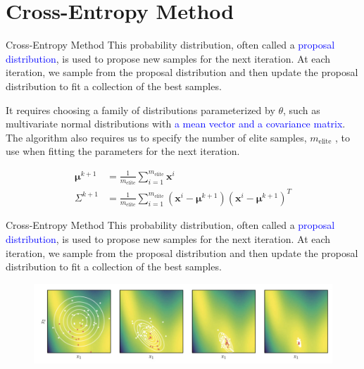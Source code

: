 \documentclass{beamer}
\begin{document}
\section{Cross-Entropy Method}
\begin{frame}{Cross-Entropy Method}
This probability distribution, often called a \textcolor{blue}{proposal distribution}, is used to propose new samples for the next iteration. At each iteration, we sample from the proposal distribution and then update the proposal distribution to fit a collection of the best samples. 

It requires choosing a family of distributions parameterized by $\theta$, such as multivariate normal distributions with \textcolor{blue}{a mean vector and a covariance matrix}. The algorithm also requires us to specify the number of elite samples, $m_\textrm{elite}$ , to use when fitting the parameters for the next iteration.

\begin{equation*}
\begin{split}
    \boldsymbol{\mu}^{k+1} &= \frac{1}{m_{\textrm{elite}}} \sum_{i=1}^{m_{\textrm{elite}}} \boldsymbol{x}^i\\
    \Sigma^{k+1} &= \frac{1}{m_{\textrm{elite}}} \sum_{i=1}^{m_{\textrm{elite}}} (\boldsymbol{x}^i - \boldsymbol{\mu}^{k+1})(\boldsymbol{x}^i - \boldsymbol{\mu}^{k+1})^T
\end{split}
\end{equation*}
\end{frame}

\begin{frame}{Cross-Entropy Method}
This probability distribution, often called a \textcolor{blue}{proposal distribution}, is used to propose new samples for the next iteration. At each iteration, we sample from the proposal distribution and then update the proposal distribution to fit a collection of the best samples. 

\begin{figure}
\centering
\includegraphics[width=120mm]{Figs/Cross-entropy.jpeg}
\end{figure}   
\end{frame}
\end{document}

